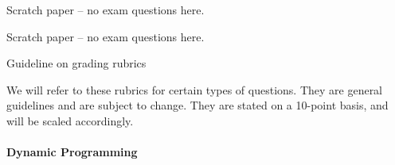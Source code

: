 \documentclass[12pt,answers,addpoints]{exam}
\newcommand{\class}[1]{\text{#1}}
\newcommand{\NP}{\class{NP}}
\begin{document}
\begin{questions}
  
\newpage
\end{questions}

\begin{center}
  Scratch paper -- no exam questions here.
\end{center}


\newpage
\begin{center}
  Scratch paper -- no exam questions here.
\end{center}

\newpage

\begin{center}
  \Large{Guideline on grading rubrics}
\end{center}

We will refer to these rubrics for certain types of questions. They
are general guidelines and are subject to change. They are stated on a
10-point basis, and will be scaled accordingly.

\paragraph{Dynamic Programming}
\end{document}
